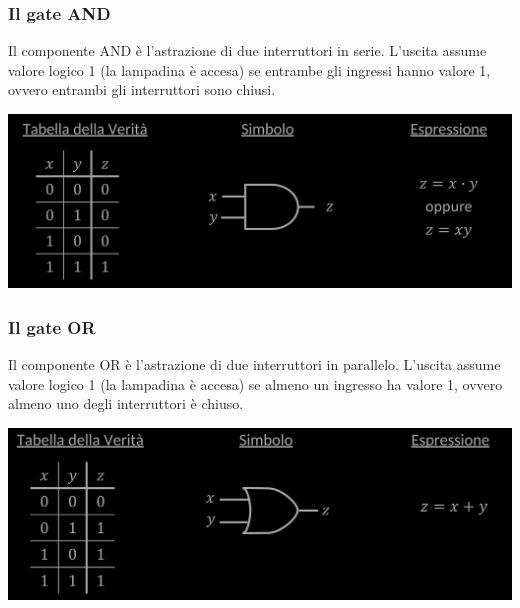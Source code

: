 \documentclass{article}
\begin{document}
\subsubsection{Il gate AND}
Il componente AND è l’astrazione di due interruttori in serie. L’uscita assume valore logico 1 (la lampadina è accesa) se entrambe gli ingressi hanno valore 1, ovvero entrambi gli interruttori sono chiusi. 
\begin{center}
    \includegraphics[scale=0.35]{desAND.png}
\end{center}
\subsubsection{Il gate OR}
Il componente OR è l’astrazione di due interruttori in parallelo. L’uscita assume valore logico 1 (la lampadina è accesa) se almeno un ingresso ha valore 1, ovvero almeno uno degli interruttori è chiuso.
\begin{center}
    \includegraphics[scale=0.35]{desOR.png}
\end{center}
\end{document}
